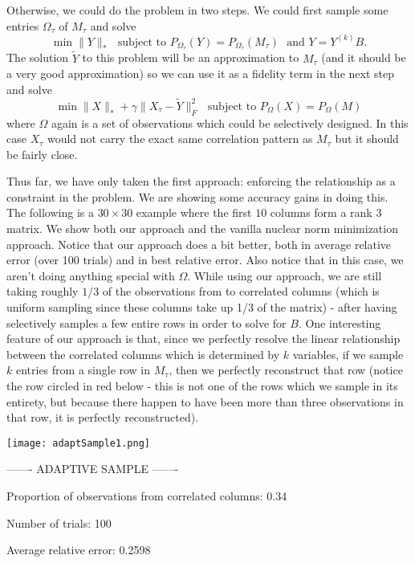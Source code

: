 \documentclass[12pt]{article}
\begin{document}
Otherwise, we could do the problem in two steps. We could first sample some entries $\Omega_\tau$ of $M_\tau$ and solve $$\min \| Y \|_* \,\, \text{ subject to } P_{\Omega_\tau}(Y) = P_{\Omega_\tau}(M_\tau) \,\, \text{ and } Y = Y^{(k)}B.$$ The solution $\tilde Y$ to this problem will be an approximation to $M_\tau$ (and it should be a very good approximation) so we can use it as a fidelity term in the next step and solve $$\min \| X \|_* + \gamma \| X_\tau - \tilde Y \|_F^2 \,\, \text{ subject to } P_{\Omega}(X) = P_{\Omega}(M)$$ where $\Omega$ again is a set of observations which could be selectively designed.  In this case $X_\tau$ would not carry the exact same correlation pattern as $M_\tau$ but it should be fairly close.

Thus far, we have only taken the first approach: enforcing the relationship as a constraint in the problem. We are showing some accuracy gains in doing this. The following is a $30 \times 30$ example where the first $10$ columns form a rank $3$ matrix. We show both our approach and the vanilla nuclear norm minimization approach. Notice that our approach does a bit better, both in average relative error (over 100 trials) and in best relative error. Also notice that in this case, we aren't doing anything special with $\Omega$. While using our approach, we are still taking roughly $1/3$ of the observations from to correlated columns (which is uniform sampling since these columns take up 1/3 of the matrix) - after having selectively samples a few entire rows in order to solve for $B$.  One interesting feature of our approach is that, since we perfectly resolve the linear relationship between the correlated columns which is determined by $k$ variables, if we sample $k$ entries from a single row in $M_\tau$, then we perfectly reconstruct that row (notice the row circled in red below - this is not one of the rows which we sample in its entirety, but because there happen to have been more than three observations in that row, it is perfectly reconstructed).

  \begin{center}
\texttt{[image: adaptSample1.png]}\\
\end{center}  

------- ADAPTIVE SAMPLE -------

Proportion of observations from correlated columns: 0.34

Number of trials: 100

Average relative error: 0.2598
\end{document}

